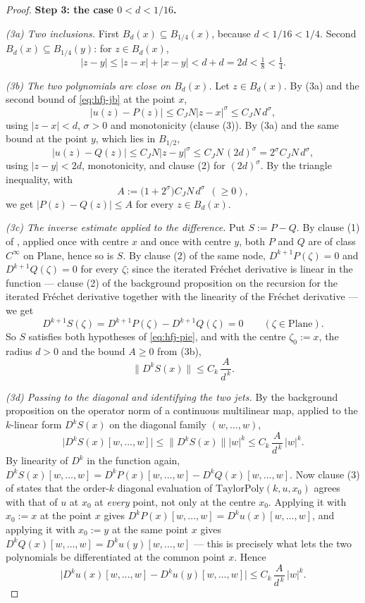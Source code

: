 \begin{proof}
\medskip\noindent\textbf{Step 3: the case $0<d<1/16$.}

\emph{(3a) Two inclusions.}  First $B_d(x)\subseteq B_{1/4}(x)$, because $d<1/16<1/4$.  Second
$B_d(x)\subseteq B_{1/4}(y)$: for $z\in B_d(x)$,
\[
  \lvert z-y\rvert\le\lvert z-x\rvert+\lvert x-y\rvert<d+d=2d<\tfrac18<\tfrac14 .
\]

\emph{(3b) The two polynomials are close on $B_d(x)$.}  Let $z\in B_d(x)$.  By (3a) and the
second bound of \eqref{eq:hfj-jb} at the point $x$,
\[
  \lvert u(z)-P(z)\rvert\le C_JN\lvert z-x\rvert^{\sigma}\le C_JN\,d^{\sigma},
\]
using $\lvert z-x\rvert<d$, $\sigma>0$ and monotonicity (clause (3)).  By (3a) and the same
bound at the point $y$, which lies in $B_{1/2}$,
\[
  \lvert u(z)-Q(z)\rvert\le C_JN\lvert z-y\rvert^{\sigma}\le C_JN\,(2d)^{\sigma}
  =2^{\sigma}C_JN\,d^{\sigma},
\]
using $\lvert z-y\rvert<2d$, monotonicity, and clause (2) for $(2d)^{\sigma}$.  By the triangle
inequality, with
\[
  A:=\bigl(1+2^{\sigma}\bigr)C_JN\,d^{\sigma}\ \ (\ge0),
\]
we get $\lvert P(z)-Q(z)\rvert\le A$ for every $z\in B_d(x)$.

\emph{(3c) The inverse estimate applied to the difference.}  Put $S:=P-Q$.  By clause (1) of
, applied once with centre $x$ and once with centre $y$, both $P$ and
$Q$ are of class $C^{\infty}$ on $\mathrm{Plane}$, hence so is $S$.  By clause (2) of the same
node, $D^{k+1}P(\zeta)=0$ and $D^{k+1}Q(\zeta)=0$ for every $\zeta$; since the iterated
Fr\'echet derivative is linear in the function --- clause (2) of the background proposition on
the recursion for the iterated Fr\'echet derivative together with the linearity of the
Fr\'echet derivative --- we get
\[
  D^{k+1}S(\zeta)=D^{k+1}P(\zeta)-D^{k+1}Q(\zeta)=0\qquad(\zeta\in\mathrm{Plane}).
\]
So $S$ satisfies both hypotheses of \eqref{eq:hfj-pie}, and with the centre $\zeta_0:=x$, the
radius $d>0$ and the bound $A\ge0$ from (3b),
\[
  \bigl\lVert D^{k}S(x)\bigr\rVert\le C_k\,\frac{A}{d^{\,k}} .
\]

\emph{(3d) Passing to the diagonal and identifying the two jets.}  By the background
proposition on the operator norm of a continuous multilinear map, applied to the $k$-linear form
$D^{k}S(x)$ on the diagonal family $(w,\ldots,w)$,
\[
  \bigl\lvert D^{k}S(x)[w,\ldots,w]\bigr\rvert\le\bigl\lVert D^{k}S(x)\bigr\rVert
  \lvert w\rvert^{k}\le C_k\,\frac{A}{d^{\,k}}\,\lvert w\rvert^{k}.
\]
By linearity of $D^{k}$ in the function again,
$D^{k}S(x)[w,\ldots,w]=D^{k}P(x)[w,\ldots,w]-D^{k}Q(x)[w,\ldots,w]$.  Now clause (3) of
 states that the order-$k$ diagonal evaluation of
$\mathrm{TaylorPoly}(k,u,x_0)$ agrees with that of $u$ at $x_0$ at \emph{every} point, not only
at the centre $x_0$.  Applying it with $x_0:=x$ at the point $x$ gives
$D^{k}P(x)[w,\ldots,w]=D^{k}u(x)[w,\ldots,w]$, and applying it with $x_0:=y$ at the same point
$x$ gives $D^{k}Q(x)[w,\ldots,w]=D^{k}u(y)[w,\ldots,w]$ --- this is precisely what lets the two
polynomials be differentiated at the common point $x$.  Hence
\begin{equation}\label{eq:hfj-mid}
  \bigl\lvert D^{k}u(x)[w,\ldots,w]-D^{k}u(y)[w,\ldots,w]\bigr\rvert
  \le C_k\,\frac{A}{d^{\,k}}\,\lvert w\rvert^{k}.
\end{equation}


\end{proof}
